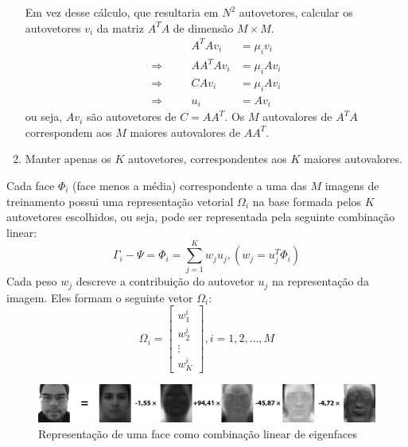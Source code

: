 \begin{enumerate}
    Em vez desse cálculo, que resultaria em $N^2$ autovetores, calcular os autovetores $v_i$ da matriz $A^TA$ de dimensão $M \times M$.
    \begin{equation} \label{eq:eign_autov}
    \begin{alignedat}{2}
                     && A^T Av_i    &= \mu_i v_i\\
    \Rightarrow\quad && AA^T Av_i   &= \mu_i Av_i\\
    \Rightarrow\quad && CAv_i       &= \mu_i Av_i\\
    \Rightarrow\quad && u_i         &= Av_i
    \end{alignedat}
    \end{equation}
    ou seja, $Av_i$ são autovetores de $C = AA^T$. Os $M$ autovalores de $A^TA$ correspondem aos $M$ maiores autovalores de $AA^T$.
    \item Manter apenas os $K$ autovetores, correspondentes aos $K$ maiores autovalores.
\end{enumerate}

Cada face $\Phi_i$ (face menos a média) correspondente a uma das $M$ imagens de treinamento possui uma representação vetorial $\Omega_i$ na base formada pelos $K$ autovetores escolhidos, ou seja, pode ser representada pela seguinte combinação linear:
%
\begin{equation} \label{eq:eign_lincomb}
    \Gamma_i - \Psi = \Phi_i = \sum_{j=1}^{K}w_ju_j, (w_j = u_{j}^{T}\Phi_i)
\end{equation}
%
Cada peso $w_j$ descreve a contribuição do autovetor $u_j$ na representação da imagem. Eles formam o seguinte vetor $\Omega_i$:
%
\begin{equation} \label{eq:eign_lincomb_vetor}
\Omega_i = \begin{bmatrix}
        w_{1}^{i}\\ 
        w_{2}^{i}\\ 
        \vdots\\ 
        w_{K}^{i}
        \end{bmatrix}, i = 1, 2, \ldots, M
\end{equation}
%

\begin{figure}[htbp]
    \centering
    \caption{Representação de uma face como combinação linear de eigenfaces}
    \label{fig:eign_lincomb}
    \includegraphics[width=0.95\linewidth]{imagens/eign_lincomb.png}
\end{figure}

